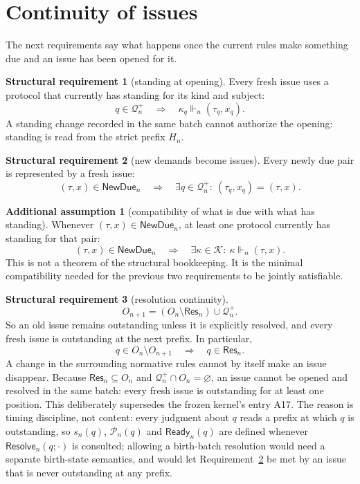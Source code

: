 \documentclass[11pt]{article}
\theoremstyle{definition}
\newtheorem{requirement}{Structural requirement}
\newtheorem*{assumption}{Additional assumption}
\theoremstyle{remark}
\newcommand{\NewDue}{\mathsf{NewDue}}
\newcommand{\Resolve}{\mathsf{Resolve}}
\newcommand{\Pre}{\mathcal P}
\newcommand{\Ready}{\mathsf{Ready}}
\newcommand{\ResSet}{\mathsf{Res}}
\newcommand{\Born}{\mathcal Q^{+}}
\begin{document}
\section{Continuity of issues}\label{sec:issues}

The next requirements say what happens once the current rules make something
due and an issue has been opened for it.

\begin{requirement}[standing at opening]\label{req:anchor}
Every fresh issue uses a protocol that currently has standing for its kind and
subject:
\[
 q\in\Born_n\quad\Longrightarrow\quad
 \kappa_q\Vdash_n(\tau_q,x_q).
\]
A standing change recorded in the same batch cannot authorize the opening:
standing is read from the strict prefix $H_n$.
\end{requirement}

\begin{requirement}[new demands become issues]\label{req:due}
Every newly due pair is represented by a fresh issue:
\[
 (\tau,x)\in\NewDue_n
 \quad\Longrightarrow\quad
 \exists q\in\Born_n:\ (\tau_q,x_q)=(\tau,x).
\]
\end{requirement}

\begin{assumption}[compatibility of what is due with what has standing]\label{assump:compat}
Whenever $(\tau,x)\in\NewDue_n$, at least one protocol currently has standing
for that pair:
\[
 (\tau,x)\in\NewDue_n
 \quad\Longrightarrow\quad
 \exists\kappa\in\mathcal K:\ \kappa\Vdash_n(\tau,x).
\]
This is not a theorem of the structural bookkeeping. It is the minimal
compatibility needed for the previous two requirements to be jointly
satisfiable.
\end{assumption}

\begin{requirement}[resolution continuity]\label{req:resolution-continuity}
\[
 O_{n+1}=(O_n\setminus\ResSet_n)\cup\Born_n.
\]
So an old issue remains outstanding unless it is explicitly resolved, and
every fresh issue is outstanding at the next prefix. In particular,
\[
 q\in O_n\setminus O_{n+1}\quad\Longrightarrow\quad q\in\ResSet_n.
\]
A change in the surrounding normative rules cannot by itself make an issue
disappear. Because $\ResSet_n\subseteq O_n$ and $\Born_n\cap O_n=\varnothing$,
an issue cannot be opened and resolved in the same batch: every fresh issue is
outstanding for at least one position. This deliberately supersedes the frozen
kernel's entry A17. The reason is timing discipline, not content: every
judgment about $q$ reads a prefix at which $q$ is outstanding, so
$s_n(q)$, $\Pre_n(q)$ and $\Ready_n(q)$ are defined whenever $\Resolve_n(q;\cdot)$
is consulted; allowing a birth-batch resolution would need a separate
birth-state semantics, and would let Requirement~\ref{req:due} be met by an
issue that is never outstanding at any prefix.
\end{requirement}
\end{document}
